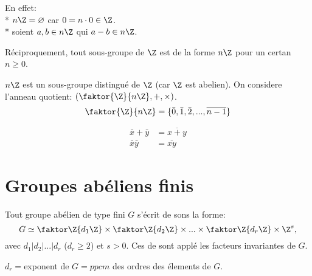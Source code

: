 En effet: \\
* $n\Z=\varnothing$ car $0=n\cdot 0\in\Z$.\\
* soient $a,b\in n\Z$ qui $a-b\in n\Z$. 

Réciproquement, tout sous-groupe de $\Z$ est de la forme $n\Z$ pour un certan $n\geq 0$.

$n\Z$ est un sous-groupe distingué de $\Z$ (car $\Z$ est abelien). On considere l'anneau quotient: $(\faktor{\Z}{n\Z}, +, \times)$.
$$\faktor{\Z}{n\Z}=\{\bar 0,\bar 1, \bar 2, ..., \overline{n-1}\}$$

\begin{align}
	\bar x+\bar y &= \overline{x+y}\\
	\bar x \bar y &= \overline{xy}
\end{align}

\section{Groupes abéliens finis}

\begin{theorem}
	Tout groupe abélien de type fini $G$ s'écrit de sons la forme:
	$$G\simeq \faktor\Z{d_1\Z} \times \faktor\Z{d_2\Z} \times ... \times \faktor\Z{d_r\Z} \times \Z^s,$$
	avec $d_1|d_2|...|d_r$ ($d_r\geq 2$) et $s>0$. Ces de sont applé les facteurs invariantes de $G$.
\end{theorem}
\begin{remark}
	$d_r = $exponent de $G = ppcm$ des ordres des élements de $G$. 
\end{remark}


